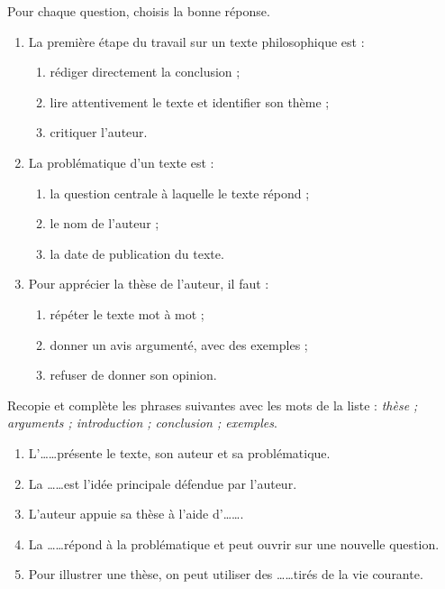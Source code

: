 \documentclass[11pt]{article}
\begin{document}
\begin{exercice}[QCM]
Pour chaque question, choisis la bonne réponse.
\begin{enumerate}
\item La première étape du travail sur un texte philosophique est :
\begin{enumerate}
\item rédiger directement la conclusion ;
\item lire attentivement le texte et identifier son thème ;
\item critiquer l'auteur.
\end{enumerate}
\item La problématique d'un texte est :
\begin{enumerate}
\item la question centrale à laquelle le texte répond ;
\item le nom de l'auteur ;
\item la date de publication du texte.
\end{enumerate}
\item Pour apprécier la thèse de l'auteur, il faut :
\begin{enumerate}
\item répéter le texte mot à mot ;
\item donner un avis argumenté, avec des exemples ;
\item refuser de donner son opinion.
\end{enumerate}
\end{enumerate}
\end{exercice}

\begin{exercice}
Recopie et complète les phrases suivantes avec les mots de la liste : \emph{thèse ; arguments ; introduction ; conclusion ; exemples}.
\begin{enumerate}
\item L'\ldots\ldots présente le texte, son auteur et sa problématique.
\item La \ldots\ldots est l'idée principale défendue par l'auteur.
\item L'auteur appuie sa thèse à l'aide d'\ldots\ldots .
\item La \ldots\ldots répond à la problématique et peut ouvrir sur une nouvelle question.
\item Pour illustrer une thèse, on peut utiliser des \ldots\ldots tirés de la vie courante.
\end{enumerate}
\end{exercice}
\end{document}
